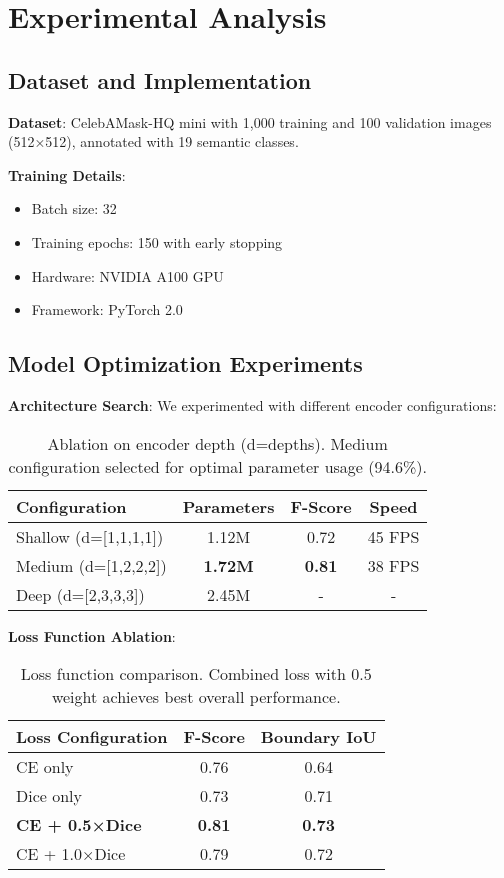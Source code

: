 \section{Experimental Analysis}
\label{sec:experiments}

\subsection{Dataset and Implementation}

\textbf{Dataset}: CelebAMask-HQ mini with 1,000 training and 100 validation images (512×512), annotated with 19 semantic classes.

\textbf{Training Details}: 
\begin{itemize}
    \item Batch size: 32
    \item Training epochs: 150 with early stopping
    \item Hardware: NVIDIA A100 GPU
    \item Framework: PyTorch 2.0
\end{itemize}

\subsection{Model Optimization Experiments}

\textbf{Architecture Search}: We experimented with different encoder configurations:

\begin{table}[h]
\centering
\small
\begin{tabular}{lccc}
\hline
Configuration & Parameters & F-Score & Speed \\
\hline
Shallow (d=[1,1,1,1]) & 1.12M & 0.72 & 45 FPS \\
Medium (d=[1,2,2,2]) & \textbf{1.72M} & \textbf{0.81} & 38 FPS \\
Deep (d=[2,3,3,3]) & 2.45M & - & - \\
\hline
\end{tabular}
\caption{Ablation on encoder depth (d=depths). Medium configuration selected for optimal parameter usage (94.6\%).}
\end{table}

\textbf{Loss Function Ablation}:

\begin{table}[h]
\centering
\small
\begin{tabular}{lcc}
\hline
Loss Configuration & F-Score & Boundary IoU \\
\hline
CE only & 0.76 & 0.64 \\
Dice only & 0.73 & 0.71 \\
\textbf{CE + 0.5×Dice} & \textbf{0.81} & \textbf{0.73} \\
CE + 1.0×Dice & 0.79 & 0.72 \\
\hline
\end{tabular}
\caption{Loss function comparison. Combined loss with 0.5 weight achieves best overall performance.}
\end{table}


